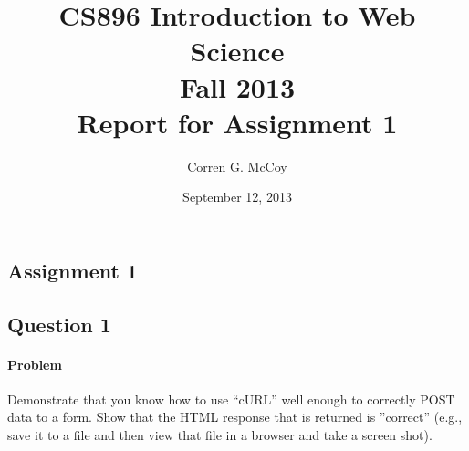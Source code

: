\documentclass[letterpaper,11pt]{report}
\begin{document}
 
\begin{savenotes}
\pagestyle{plain}
\title{CS896 Introduction to Web Science\\Fall 2013\\Report for Assignment 1}
\author{Corren G. McCoy}
 
\date{September 12, 2013}
\maketitle

\renewcommand*\thesection{\arabic{section}}
\setcounter{section}{0}

\setcounter{tocdepth}{4}
\tableofcontents
 \listoffigures
 \listoftables
\newpage


\section{Assignment 1}
\subsection{Question 1}
\paragraph{Problem}
Demonstrate that you know how to use ``cURL'' well enough to correctly POST data to a form.  Show that the HTML response that is returned is ''correct'' (e.g., save it to a file and then view that file in a browser and take a screen shot).

\end{savenotes}
\end{document}
